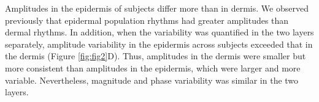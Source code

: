 Amplitudes in the epidermis of subjects differ more than in dermis. We observed previously that epidermal population rhythms had greater amplitudes than dermal rhythms. In addition, when the variability was quantified in the two layers separately, amplitude variability in the epidermis across subjects exceeded that in the dermis (Figure \ref{fig:fig2}D). Thus, amplitudes in the dermis were smaller but more consistent than amplitudes in the epidermis, which were larger and more variable. Nevertheless, magnitude and phase variability was similar in the two layers. 


